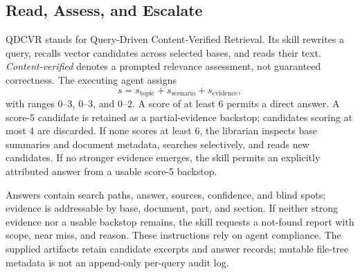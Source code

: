 \subsection{Read, Assess, and Escalate}
QDCVR stands for Query-Driven Content-Verified Retrieval. Its skill rewrites
a query,
recalls vector candidates across selected bases, and reads their text.
\emph{Content-verified} denotes a prompted relevance assessment, not guaranteed
correctness. The executing agent assigns
\[
s=s_{\mathrm{topic}}+s_{\mathrm{scenario}}+s_{\mathrm{evidence}},
\]
with ranges $0$--$3$, $0$--$3$, and $0$--$2$. A score of at least 6 permits
a direct answer. A score-5 candidate is retained as a partial-evidence
backstop; candidates scoring at most 4 are discarded. If none scores at least
6, the librarian inspects base summaries and document metadata, searches
selectively, and reads new candidates. If no stronger evidence emerges, the
skill permits an explicitly attributed answer from a usable score-5 backstop.

Answers contain search paths, answer, sources, confidence, and blind spots;
evidence is addressable by base, document, part, and section. If neither strong evidence
nor a usable backstop remains, the skill requests a not-found report with
scope, near miss, and reason. These instructions rely on agent compliance. The
supplied artifacts retain candidate excerpts and answer records; mutable
file-tree metadata is not an append-only per-query audit log.

